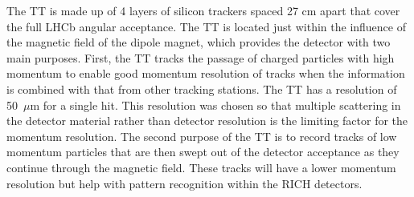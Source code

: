 The TT is made up of 4 layers of silicon trackers spaced 27 cm apart that cover the full LHCb angular acceptance. The TT is located just within the influence of the magnetic field of the dipole magnet, which provides the detector with two main purposes. First, the TT tracks the passage of charged particles with high momentum to enable good momentum resolution of tracks when the information is combined with that from other tracking stations. The TT has a resolution of 50~$\mu$m for a single hit. This resolution was chosen so that multiple scattering in the detector material rather than detector resolution is the limiting factor for the momentum resolution. The second purpose of the TT is to record tracks of low momentum particles that are then swept out of the detector acceptance as they continue through the magnetic field. These tracks will have a lower momentum resolution but help with pattern recognition within the RICH detectors. 


